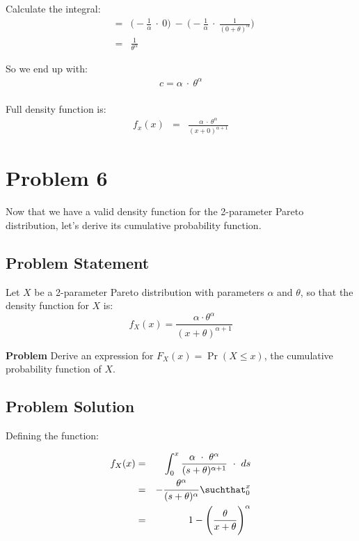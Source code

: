 \documentclass[12pt]{article}
\theoremstyle{definition}
\begin{document}
Calculate the integral:
\begin{eqnarray*}
& = & \bigg( -\frac{1}{\alpha} \ \cdot \ 0 \bigg) \ - \ \Bigg( - \frac{1}{\alpha} \ \cdot \ \frac{1}{(0 + \theta)^\alpha}\Bigg)\\
& = & \frac{1}{\theta^\alpha}
\end{eqnarray*}

So we end up with:
\begin{eqnarray*}
c = \alpha \ \cdot \ \theta^\alpha \\
\end{eqnarray*}

Full density function is:
\begin{eqnarray*}
f_x(x) & = & \frac{\alpha \ \cdot \ \theta^\alpha}{(x + 0)^{\alpha + 1}}
\end{eqnarray*}

\newpage
\section*{Problem 6}

Now that we have a valid density function for the 2-parameter Pareto distribution, let's derive its cumulative probability function.

\subsection*{Problem Statement}

Let $X$ be a 2-parameter Pareto distribution with parameters $\alpha$ and $\theta$, so that the density function for $X$ is:
$$
f_X(x) = \frac{\alpha \cdot \theta^\alpha}{(x + \theta)^{\alpha + 1}}
$$

\bigskip
\noindent
{\bf Problem} Derive an expression for $F_X(x) = \Pr(X \leq x)$, the cumulative probability function of $X$.

\subsection*{Problem Solution}

Defining the function:

\begin{eqnarray*}
f_X(x) & = & \int_0^x \frac{\alpha \ \cdot \ \theta^\alpha}{(s + \theta)^{\alpha + 1}} \ \cdot \ ds \\
& = & - \frac{\theta^\alpha}{(s + \theta)^\alpha} \suchthat_0^x \\
& = & 1 - \Bigg( \frac{\theta}{x + \theta} \Bigg)^\alpha \\
\end{eqnarray*}
\end{document}
